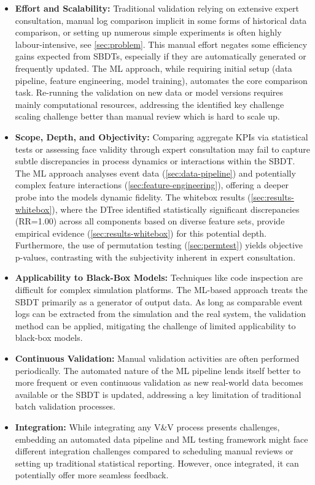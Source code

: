 \begin{itemize}
  \item \textbf{Effort and Scalability:} Traditional validation relying on extensive expert consultation, manual log comparison implicit in some forms of historical data comparison, or setting up numerous simple experiments is often highly labour-intensive, see \autoref{sec:problem}. This manual effort negates some efficiency gains expected from SBDTs, especially if they are automatically generated or frequently updated. The ML approach, while requiring initial setup (data pipeline, feature engineering, model training), automates the core comparison task. Re-running the validation on new data or model versions requires mainly computational resources, addressing the identified key challenge scaling challenge better than manual review which is hard to scale up.

  \item \textbf{Scope, Depth, and Objectivity:} Comparing aggregate KPIs via statistical tests or assessing face validity through expert consultation may fail to capture subtle discrepancies in process dynamics or interactions within the SBDT. The ML approach analyses event data (\autoref{sec:data-pipeline}) and potentially complex feature interactions (\autoref{sec:feature-engineering}), offering a deeper probe into the models dynamic fidelity. The whitebox results (\autoref{sec:results-whitebox}), where the DTree identified statistically significant discrepancies (RR=1.00) across all components based on diverse feature sets, provide empirical evidence (\autoref{sec:results-whitebox}) for this potential depth. Furthermore, the use of permutation testing (\autoref{sec:permtest}) yields objective p-values, contrasting with the subjectivity inherent in expert consultation.

  \item \textbf{Applicability to Black-Box Models:} Techniques like code inspection are difficult for complex simulation platforms. The ML-based approach treats the SBDT primarily as a generator of output data. As long as comparable event logs can be extracted from the simulation and the real system, the validation method can be applied, mitigating the challenge of limited applicability to black-box models.

  \item \textbf{Continuous Validation:} Manual validation activities are often performed periodically. The automated nature of the ML pipeline lends itself better to more frequent or even continuous validation as new real-world data becomes available or the SBDT is updated, addressing a key limitation of traditional batch validation processes.

  \item \textbf{Integration:} While integrating any V\&V process presents challenges, embedding an automated data pipeline and ML testing framework might face different integration challenges compared to scheduling manual reviews or setting up traditional statistical reporting. However, once integrated, it can potentially offer more seamless feedback.
\end{itemize}

